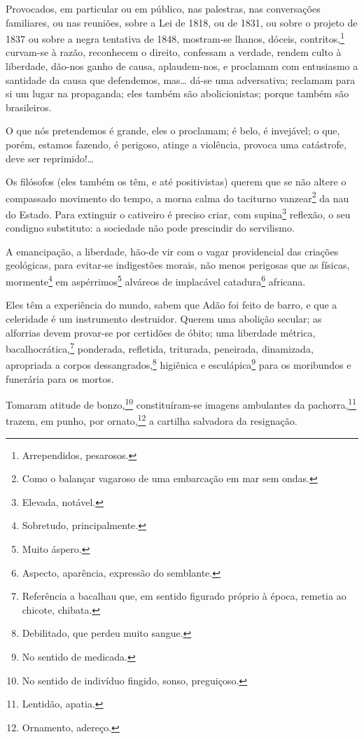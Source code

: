 Provocados, em particular ou em público, nas palestras, nas conversações
familiares, ou nas reuniões, sobre a Lei de 1818, ou de 1831, ou sobre o
projeto de 1837 ou sobre a negra tentativa de 1848, mostram-se lhanos,
dóceis, contritos,\footnote{Arrependidos, pesarosos.} curvam-se à
razão, reconhecem o direito, confessam a verdade, rendem culto à
liberdade, dão-nos ganho de causa, aplaudem-nos, e proclamam com
entusiasmo a santidade da causa que defendemos, mas\ldots{} dá-se uma
adversativa; reclamam para si um lugar na propaganda; eles também são
abolicionistas; porque também são brasileiros.

O que nós pretendemos é grande, eles o proclamam; é belo, é invejável; o
que, porém, estamos fazendo, é perigoso, atinge a violência, provoca uma
catástrofe, deve ser reprimido!\ldots{}

Os filósofos (eles também os têm, e até positivistas) querem que se não
altere o compassado movimento do tempo, a morna calma do taciturno
vanzear\footnote{Como o balançar vagaroso de uma embarcação em mar sem
  ondas.} da nau do Estado. Para extinguir o cativeiro é preciso criar,
com supina\footnote{Elevada, notável.} reflexão, o seu condigno
substituto: a sociedade não pode prescindir do servilismo.

A emancipação, a liberdade, hão-de vir com o vagar providencial das
criações geológicas, para evitar-se indigestões morais, não menos
perigosas que as físicas, mormente\footnote{Sobretudo, principalmente.}
em aspérrimos\footnote{Muito áspero.} alváreos de implacável
catadura\footnote{Aspecto, aparência, expressão do semblante.}
africana.

Eles têm a experiência do mundo, sabem que Adão foi feito de barro, e 
que a celeridade é um instrumento destruidor. Querem uma abolição
secular; as alforrias devem provar-se por certidões de óbito; uma
liberdade métrica, bacalhocrática,\footnote{Referência a bacalhau que,
  em sentido figurado próprio à época, remetia ao chicote, chibata.}
ponderada, refletida, triturada, peneirada, dinamizada, apropriada a
corpos dessangrados,\footnote{Debilitado, que perdeu muito sangue.}
higiênica e esculápica\footnote{No sentido de medicada.} para os
moribundos e funerária para os mortos.

Tomaram atitude de bonzo,\footnote{No sentido de indivíduo fingido,
  sonso, preguiçoso.} constituíram-se imagens ambulantes da
pachorra,\footnote{Lentidão, apatia.} trazem, em punho, por
ornato,\footnote{Ornamento, adereço.} a cartilha salvadora da
resignação.

